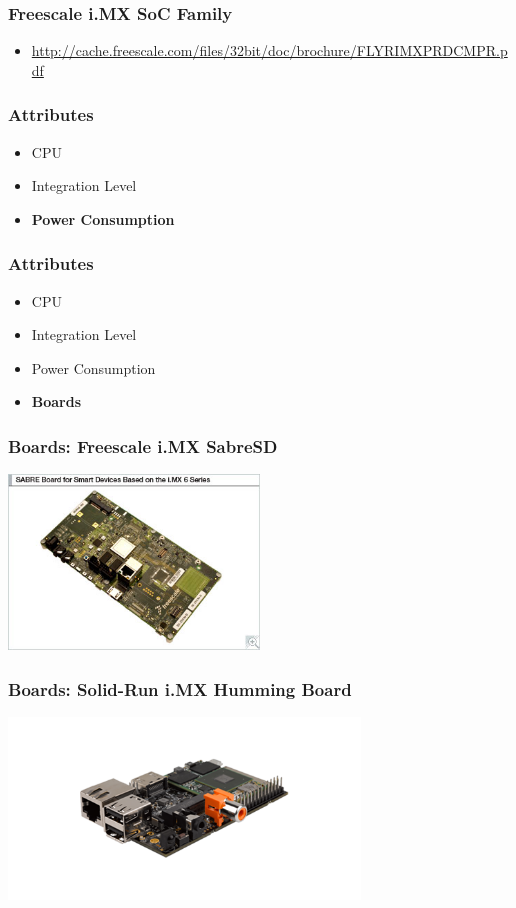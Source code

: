 \begin{frame}
\frametitle{Freescale i.MX SoC Family}
  \begin{itemize}
    \item
     \url{http://cache.freescale.com/files/32bit/doc/brochure/FLYRIMXPRDCMPR.pdf} 
  \end{itemize}
\end{frame}

\begin{frame}
  \frametitle{Attributes}
  \begin{itemize}
    \item CPU
    \item Integration Level
    \item {\bf Power Consumption}
  \end{itemize}
\end{frame}

\begin{frame}
  \frametitle{Attributes}
  \begin{itemize}
    \item CPU
    \item Integration Level
    \item Power Consumption
    \item {\bf Boards}
  \end{itemize}
\end{frame}

\begin{frame}
  \frametitle{Boards: Freescale i.MX SabreSD}
  \begin{center}
    \includegraphics[width=0.5\textwidth]{slides/te5009-embedded-systems-attributes/RDIMX6SABREBRD_BDTN.jpg}
  \end{center}
\end{frame}

\begin{frame}
  \frametitle{Boards: Solid-Run i.MX Humming Board}
  \begin{center}
    \includegraphics[width=0.7\textwidth]{common/Img_HummingBoard_2.png}
  \end{center}
\end{frame}

